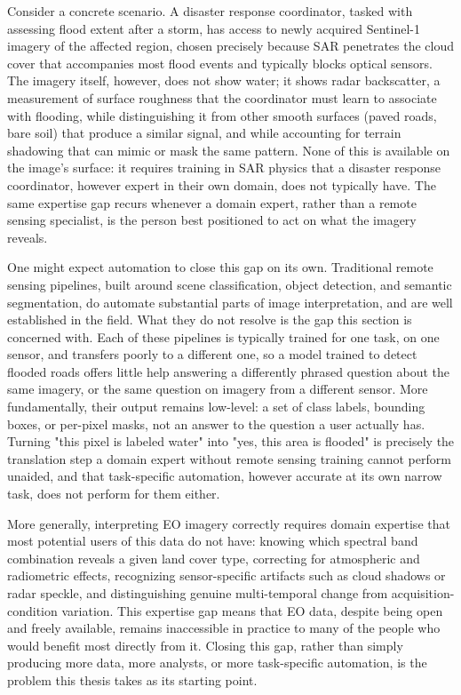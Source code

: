 Consider a concrete scenario. A disaster response coordinator, tasked with assessing flood extent after a storm, has access to newly acquired Sentinel-1 imagery of the affected region, chosen precisely because SAR penetrates the cloud cover that accompanies most flood events and typically blocks optical sensors. The imagery itself, however, does not show water; it shows radar backscatter, a measurement of surface roughness that the coordinator must learn to associate with flooding, while distinguishing it from other smooth surfaces (paved roads, bare soil) that produce a similar signal, and while accounting for terrain shadowing that can mimic or mask the same pattern. None of this is available on the image's surface: it requires training in SAR physics that a disaster response coordinator, however expert in their own domain, does not typically have. The same expertise gap recurs whenever a domain expert, rather than a remote sensing specialist, is the person best positioned to act on what the imagery reveals.
 
One might expect automation to close this gap on its own. Traditional remote sensing pipelines, built around scene classification, object detection, and semantic segmentation, do automate substantial parts of image interpretation, and are well established in the field. What they do not resolve is the gap this section is concerned with. Each of these pipelines is typically trained for one task, on one sensor, and transfers poorly to a different one, so a model trained to detect flooded roads offers little help answering a differently phrased question about the same imagery, or the same question on imagery from a different sensor. More fundamentally, their output remains low-level: a set of class labels, bounding boxes, or per-pixel masks, not an answer to the question a user actually has. Turning "this pixel is labeled water" into "yes, this area is flooded" is precisely the translation step a domain expert without remote sensing training cannot perform unaided, and that task-specific automation, however accurate at its own narrow task, does not perform for them either.

More generally, interpreting EO imagery correctly requires domain expertise that most potential users of this data do not have: knowing which spectral band combination reveals a given land cover type, correcting for atmospheric and radiometric effects, recognizing sensor-specific artifacts such as cloud shadows or radar speckle, and distinguishing genuine multi-temporal change from acquisition-condition variation. This expertise gap means that EO data, despite being open and freely available, remains inaccessible in practice to many of the people who would benefit most directly from it. Closing this gap, rather than simply producing more data, more analysts, or more task-specific automation, is the problem this thesis takes as its starting point.
 
